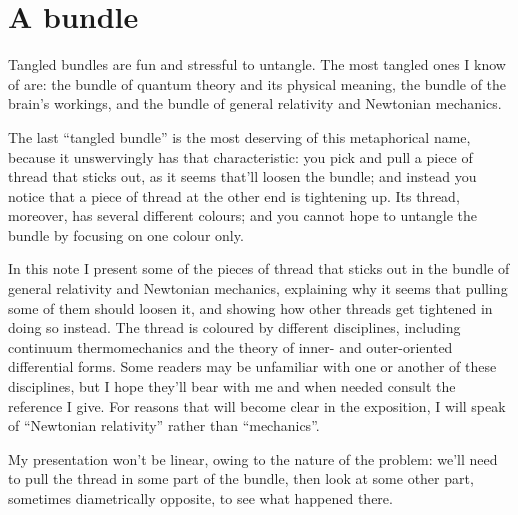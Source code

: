 \documentclass[\ifafour a4paper,12pt,\else a5paper,10pt,\fi%
onecolumn,oneside,article,%
british%
]{memoir}
\theoremstyle{remark}
\theoremstyle{innote}
\renewcommand*{\|}{\nonscript\,\vert\nonscript\;\mathopen{}}
\begin{document}



\section{A bundle}
\label{sec:soup}

Tangled bundles are fun and stressful to untangle. The most tangled
ones I know of are: the bundle of quantum theory and its physical meaning,
the bundle of the brain's workings, and the bundle of general relativity
and Newtonian mechanics.

The last \enquote{tangled bundle} is the most deserving of this
metaphorical name, because it unswervingly has that characteristic: you
pick and pull a piece of thread that sticks out, as it seems that'll loosen
the bundle; and instead you notice that a piece of thread at the other end
is tightening up. Its thread, moreover, has several different colours; and
you cannot hope to untangle the bundle by focusing on one colour only.

In this note I present some of the pieces of thread that sticks out in the
bundle of general relativity and Newtonian mechanics, explaining why it
seems that pulling some of them should loosen it, and showing how other
threads get tightened in doing so instead. The thread is coloured by
different disciplines, including continuum thermomechanics and the theory
of inner- and outer-oriented differential forms. Some readers may be
unfamiliar with one or another of these disciplines, but I hope they'll
bear with me and when needed consult the reference I give. For reasons that
will become clear in the exposition, I will speak of \enquote{Newtonian
  relativity} rather than \enquote{mechanics}.

My presentation won't be linear, owing to the nature of the problem: we'll
need to pull the thread in some part of the bundle, then look at some other
part, sometimes diametrically opposite, to see what happened there.
\end{document}
